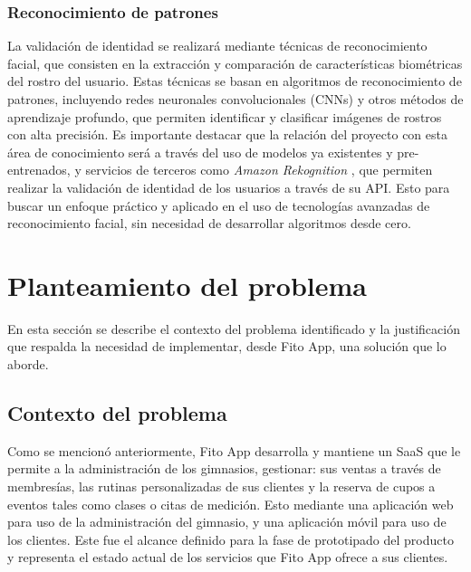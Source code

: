 \subsubsection{Reconocimiento de patrones}
La validación de identidad se realizará mediante técnicas de reconocimiento facial, que consisten en la extracción y comparación de características biométricas del rostro del usuario. Estas técnicas se basan en algoritmos de reconocimiento de patrones, incluyendo redes neuronales convolucionales (CNNs) y otros métodos de aprendizaje profundo, que permiten identificar y clasificar imágenes de rostros con alta precisión. Es importante destacar que la relación del proyecto con esta área de conocimiento será a través del uso de modelos ya existentes y pre-entrenados, y servicios de terceros como \textit{Amazon Rekognition} \cite{amazon_rekognition}, que permiten realizar la validación de identidad de los usuarios a través de su API. Esto para buscar un enfoque práctico y aplicado en el uso de tecnologías avanzadas de reconocimiento facial, sin necesidad de desarrollar algoritmos desde cero.



\section{Planteamiento del problema}

En esta sección se describe el contexto del problema identificado y la justificación que respalda la necesidad de implementar, desde Fito App, una solución que lo aborde.

\subsection{Contexto del problema}

Como se mencionó anteriormente, Fito App desarrolla y mantiene un SaaS que le permite a la administración de los gimnasios, gestionar: sus ventas a través de membresías, las rutinas personalizadas de sus clientes y la reserva de cupos a eventos tales como clases o citas de medición. Esto mediante una aplicación web para uso de la administración del gimnasio,  y una aplicación móvil para uso de los clientes. Este fue el alcance definido para la fase de prototipado del producto y representa el estado actual de los servicios que Fito App ofrece a sus clientes.


